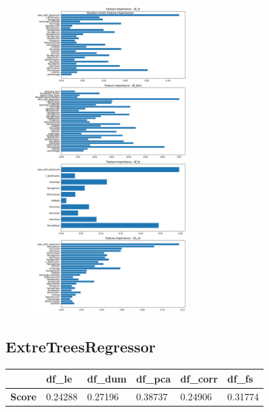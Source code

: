 \begin{figure}[H]
  \centering
  \includegraphics[width=0.53\textwidth]{./fig/ranfeas.png}
  \label{fig:corr1}
  \caption{}
\end{figure}









\subsection{ExtreTreesRegressor}
\begin{table}[H]
\begin{tabular}{l|l|l|l|l|l|}
\cline{2-6}
                                    & \textbf{df\_le} & \textbf{df\_dum} & \textbf{df\_pca} & \textbf{df\_corr} & \textbf{df\_fs} \\ \hline
\multicolumn{1}{|l|}{\textbf{Score}} & 0.24288         & 0.27196           & 0.38737          & 0.24906           & 0.31774         \\ \hline
\end{tabular}
\end{table}



